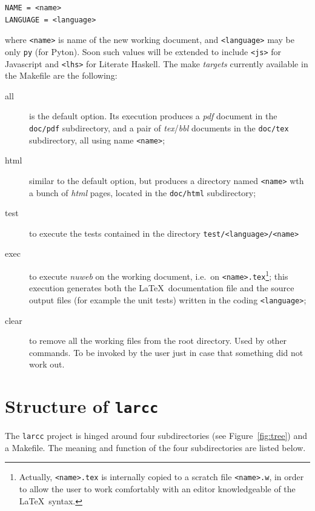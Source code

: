\begin{verbatim}
NAME = <name>
LANGUAGE = <language>
\end{verbatim}
where \texttt{<name>} is name of the new working document, and \texttt{<language>} may be only \texttt{py} (for Pyton). Soon such values will be extended to include \texttt{<js>} for Javascript and \texttt{<lhs>} for Literate Haskell.
The make \emph{targets} currently available in the Makefile are the following:
\begin{description}
\item[all] 
is the default option. Its execution produces a \emph{pdf} document in the \texttt{doc/pdf} subdirectory, and a pair of \emph{tex}/\emph{bbl} documents in the \texttt{doc/tex} subdirectory, all using name \texttt{<name>};
\item[html] 
similar to the default option, but produces a directory named \texttt{<name>} wth a bunch of \emph{html} pages, located in the \texttt{doc/html} subdirectory;

\item[test] 
to execute the tests contained in the directory \texttt{test/<language>/<name>}
\item[exec] 
to execute \emph{nuweb} on the working document, i.e.~on \texttt{<name>.tex}\footnote{Actually, \texttt{<name>.tex} is internally copied to a scratch file \texttt{<name>.w}, in order to allow the user to work comfortably with an editor knowledgeable of the \LaTeX\ syntax.}; this execution generates both the \LaTeX\ documentation file and the source output files (for example the unit tests) written in the coding \texttt{<language>};
\item[clear] 
to remove all the working files from the root directory. Used by other commands. To be invoked by the user just in case that something did not work out.
\end{description}



\section{Structure of \texttt{larcc}}

The \texttt{larcc} project is hinged around four subdirectories (see Figure~\ref{fig:tree}) and a Makefile.
The meaning and function of the four subdirectories are listed below.

